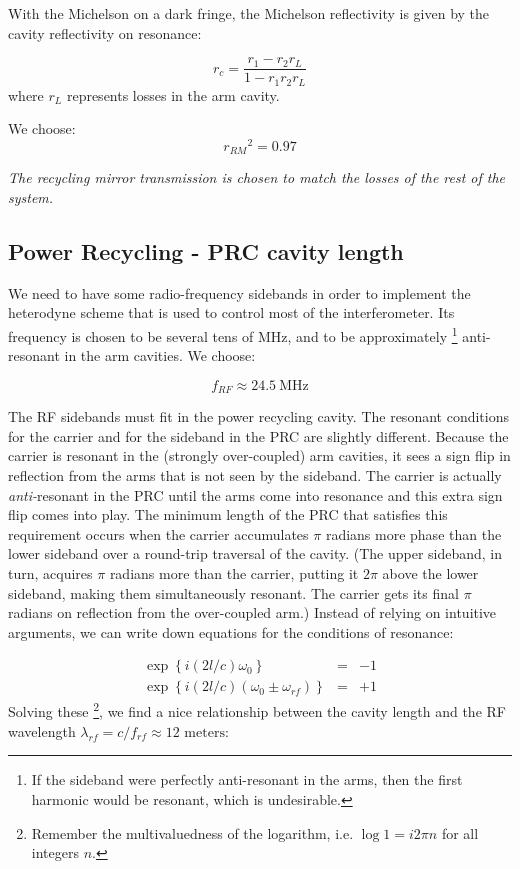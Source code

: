 With the Michelson on a dark fringe, the Michelson reflectivity is
given by the cavity reflectivity on resonance:

\begin{equation}
r_{c}=\frac{r_{1}-r_{2}r_L}{1-r_{1}r_{2}r_L}
\end{equation}
where $r_L$ represents losses in the arm cavity.

We choose:
\begin{equation}
r_{RM}{}^{2}=0.97
\end{equation}

\emph{The recycling mirror transmission is chosen to match the losses
of the rest of the system.}

\subsection*{Power Recycling - PRC cavity length}

We need to have some radio-frequency sidebands in order to implement
the heterodyne scheme that is used to control most of the interferometer.
Its frequency is chosen to be several tens of MHz, and to be approximately%
\footnote{If the sideband were perfectly anti-resonant in the arms, then the
first harmonic would be resonant, which is undesirable.%
} anti-resonant in the arm cavities. We choose:

\[
f_{RF}\approx24.5\mathrm{{\ MHz}}
\]


The RF sidebands must fit in the power recycling cavity. The resonant
conditions for the carrier and for the sideband in the PRC are slightly
different. Because the carrier is resonant in the (strongly over-coupled)
arm cavities, it sees a sign flip in reflection from the arms that
is not seen by the sideband. The carrier is actually \emph{anti-}resonant
in the PRC until the arms come into resonance and this extra sign
flip comes into play. The minimum length of the PRC that satisfies
this requirement occurs when the carrier accumulates $\pi$ radians
more phase than the lower sideband over a round-trip traversal of
the cavity. (The upper sideband, in turn, acquires $\pi$ radians
more than the carrier, putting it $2\pi$ above the lower sideband,
making them simultaneously resonant. The carrier gets its final $\pi$
radians on reflection from the over-coupled arm.) Instead of relying
on intuitive arguments, we can write down equations for the conditions
of resonance:

\begin{eqnarray}
\exp \left\{i (2l/c)\omega_{0}  \right\} &=& -1 \\
\exp \left\{i (2l/c)(\omega_{0} \pm \omega_{rf}) \right\} &=& +1
\end{eqnarray}Solving these%
\footnote{Remember the multivaluedness of the logarithm, i.e. $\log1=i2\pi n$
for all integers $n$.%
}, we find a nice relationship between the cavity length and the RF
wavelength $\lambda_{rf}=c/f_{rf}\approx12\text{ meters}$:

